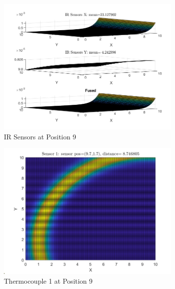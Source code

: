 \documentclass[12pt]{article}
\begin{document}
\begin{figure}[H]
    \centering
    \begin{subfigure}[h]{0.8\textwidth}
        \includegraphics[width=\textwidth]{images/P9.png}
        \caption{IR Sensors at Position 9}
        \label{fig:P9IR}
    \end{subfigure}
    \baselineskip
    \begin{subfigure}[h]{0.4\textwidth}
        \includegraphics[width=\textwidth]{images/P9S1.png}
        \caption{Thermocouple 1 at Position 9}
        \label{fig:P9S1}
    \end{subfigure}
    \begin{subfigure}[h]{0.4\textwidth}

\end{subfigure}
\end{figure}
\end{document}
